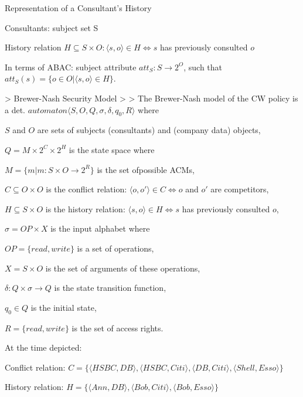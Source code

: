 \documentclass[a4paper]{article}
\begin{document}
\begin{multicols}{3}
    Representation of a Consultant’s History
    \begin{itemize*}
        \item Consultants: subject set S
        \item History relation $H\subseteq S\times O:⟨s,o⟩\in H\Leftrightarrow s$ has previously consulted $o$
        \item In terms of ABAC: subject attribute $att_S:S\rightarrow 2^O$, such that $att_S(s)=\{o\in O|⟨s,o⟩\in H\}$.
    \end{itemize*}

    > Brewer-Nash Security Model
    >
    > The Brewer-Nash model of the CW policy is a det. $automaton⟨S,O,Q,\sigma,\delta,q_0,R⟩$ where
    \begin{itemize*}
        \item $S$ and $O$ are sets of subjects (consultants) and (company data) objects,
        \item $Q=M\times 2^C\times 2^H$ is the state space where
              \begin{itemize*}
                  \item $M=\{m|m:S\times O\rightarrow 2^R\}$ is the set ofpossible ACMs,
                  \item $C\subseteq O\times O$ is the conflict relation: $⟨o,o'⟩\in C\Leftrightarrow o$ and $o'$ are competitors,
                  \item $H\subseteq S\times O$ is the history relation: $⟨s,o⟩\in H\Leftrightarrow s$ has previously
                        consulted $o$,
              \end{itemize*}
        \item $\sigma=OP \times X$ is the input alphabet where
              \begin{itemize*}
                  \item $OP=\{read,write\}$ is a set of operations,
                  \item $X=S \times O$ is the set of arguments of these operations,
              \end{itemize*}
        \item $\delta:Q \times\sigma\rightarrow Q$ is the state transition function,
        \item $q_0\in Q$ is the initial state,
        \item $R=\{read,write\}$ is the set of access rights.
    \end{itemize*}

    At the time depicted:
    \begin{itemize*}
        \item Conflict relation: $C=\{⟨HSBC,DB⟩,⟨HSBC,Citi⟩,⟨DB,Citi⟩,⟨Shell,Esso⟩\}$
        \item History relation: $H=\{⟨Ann,DB⟩,⟨Bob,Citi⟩,⟨Bob,Esso⟩\}$
    \end{itemize*}



\end{multicols}
\end{document}
